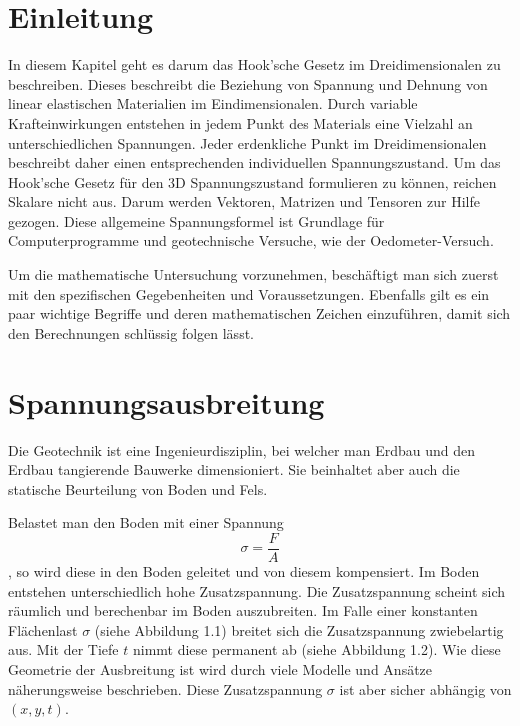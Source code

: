 \section{Einleitung\label{spannung:section:Einleitung}}
In diesem Kapitel geht es darum das Hook'sche Gesetz im Dreidimensionalen zu beschreiben.
Dieses beschreibt die Beziehung von Spannung und Dehnung von linear elastischen Materialien im Eindimensionalen.
Durch variable Krafteinwirkungen entstehen in jedem Punkt des Materials eine Vielzahl an unterschiedlichen Spannungen.
Jeder erdenkliche Punkt im Dreidimensionalen beschreibt daher einen entsprechenden individuellen Spannungszustand.
Um das Hook'sche Gesetz für den 3D Spannungszustand formulieren zu können, reichen Skalare nicht aus.
Darum werden Vektoren, Matrizen und Tensoren zur Hilfe gezogen.
Diese allgemeine Spannungsformel ist Grundlage für Computerprogramme und geotechnische Versuche, wie der Oedometer-Versuch.

Um die mathematische Untersuchung vorzunehmen, beschäftigt man sich zuerst mit den spezifischen Gegebenheiten und Voraussetzungen.
Ebenfalls gilt es ein paar wichtige Begriffe und deren mathematischen Zeichen einzuführen,
damit sich den Berechnungen schlüssig folgen lässt.

\section{Spannungsausbreitung\label{spannung:section:Spannungsausbreitung}}
Die Geotechnik ist eine Ingenieurdisziplin, bei welcher man Erdbau und den Erdbau tangierende Bauwerke dimensioniert.
Sie beinhaltet aber auch die statische Beurteilung von Boden und Fels.

Belastet man den Boden mit einer Spannung
\[
\sigma
=
\frac{F}{A}
\]
, so wird diese in den Boden geleitet und von diesem kompensiert.
Im Boden entstehen unterschiedlich hohe Zusatzspannung.
Die Zusatzspannung scheint sich räumlich und berechenbar im Boden auszubreiten.
Im Falle einer konstanten Flächenlast $\sigma$ (siehe Abbildung 1.1) breitet sich die Zusatzspannung zwiebelartig aus.
Mit der Tiefe $t$ nimmt diese permanent ab (siehe Abbildung 1.2).
Wie diese Geometrie der Ausbreitung ist wird durch viele Modelle und Ansätze näherungsweise beschrieben.
Diese Zusatzspannung $\sigma$ ist aber sicher abhängig von $(x,y,t)$.

